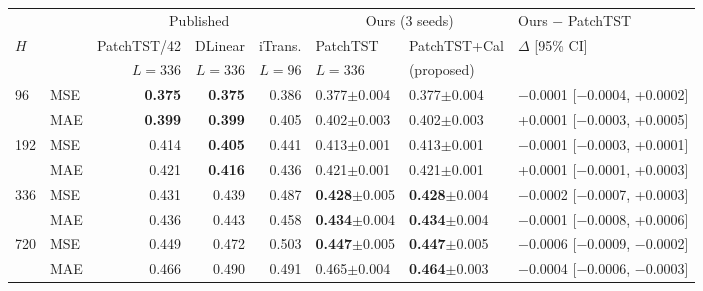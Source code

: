 {\setlength{\tabcolsep}{3.5pt}%
\begin{tabular}{@{}llrrrlll@{}}
\toprule
 & & \multicolumn{3}{c}{Published} & \multicolumn{2}{c}{Ours (3 seeds)} & Ours $-$ PatchTST \\
\cmidrule(lr){3-5}\cmidrule(lr){6-7}\cmidrule(l){8-8}
$H$ & & PatchTST/42 & DLinear & iTrans. & PatchTST & PatchTST+Cal & $\Delta$ [95\% CI] \\
 & & $L{=}336$ & $L{=}336$ & $L{=}96$ & $L{=}336$ & (proposed) & \\
\midrule
\multirow{2}{*}{96} & MSE & \textbf{0.375} & \textbf{0.375} & 0.386 & 0.377$\pm$0.004 & 0.377$\pm$0.004 & $-$0.0001 [$-$0.0004, +0.0002] \\
 & MAE & \textbf{0.399} & \textbf{0.399} & 0.405 & 0.402$\pm$0.003 & 0.402$\pm$0.003 & +0.0001 [$-$0.0003, +0.0005] \\
\midrule
\multirow{2}{*}{192} & MSE & 0.414 & \textbf{0.405} & 0.441 & 0.413$\pm$0.001 & 0.413$\pm$0.001 & $-$0.0001 [$-$0.0003, +0.0001] \\
 & MAE & 0.421 & \textbf{0.416} & 0.436 & 0.421$\pm$0.001 & 0.421$\pm$0.001 & +0.0001 [$-$0.0001, +0.0003] \\
\midrule
\multirow{2}{*}{336} & MSE & 0.431 & 0.439 & 0.487 & \textbf{0.428}$\pm$0.005 & \textbf{0.428}$\pm$0.004 & $-$0.0002 [$-$0.0007, +0.0003] \\
 & MAE & 0.436 & 0.443 & 0.458 & \textbf{0.434}$\pm$0.004 & \textbf{0.434}$\pm$0.004 & $-$0.0001 [$-$0.0008, +0.0006] \\
\midrule
\multirow{2}{*}{720} & MSE & 0.449 & 0.472 & 0.503 & \textbf{0.447}$\pm$0.005 & \textbf{0.447}$\pm$0.005 & $-$0.0006 [$-$0.0009, $-$0.0002] \\
 & MAE & 0.466 & 0.490 & 0.491 & 0.465$\pm$0.004 & \textbf{0.464}$\pm$0.003 & $-$0.0004 [$-$0.0006, $-$0.0003] \\
\bottomrule
\end{tabular}%
}
